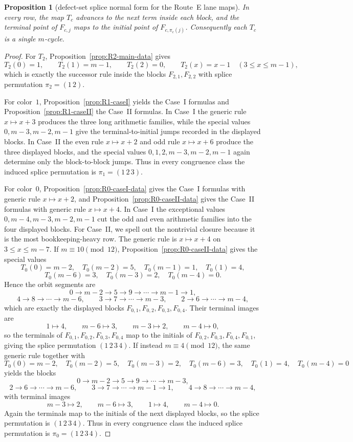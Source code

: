 \documentclass[11pt]{article}
\newtheorem{proposition}{Proposition}
\begin{document}
\begin{proposition}[defect-set splice normal form for the Route~E lane maps]
In every row, the map $T_c$ advances to the next term inside each block, and the terminal point of $F_{c,j}$ maps to the initial point of $F_{c,\pi_c(j)}$.
Consequently each $T_c$ is a single $m$-cycle.
\end{proposition}

\begin{proof}
For $T_2$, Proposition~\ref{prop:R2-main-data} gives
\[
T_2(0)=1,\qquad T_2(1)=m-1,\qquad T_2(2)=0,\qquad T_2(x)=x-1\quad (3\le x\le m-1),
\]
which is exactly the successor rule inside the blocks $F_{2,1},F_{2,2}$ with splice permutation $\pi_2=(1\,2)$.

For color~$1$, Proposition~\ref{prop:R1-caseI} yields the Case~I formulas and Proposition~\ref{prop:R1-caseII} the Case~II formulas.
In Case~I the generic rule $x\mapsto x+3$ produces the three long arithmetic families, while the special values $0,m-3,m-2,m-1$ give the terminal-to-initial jumps recorded in the displayed blocks.
In Case~II the even rule $x\mapsto x+2$ and odd rule $x\mapsto x+6$ produce the three displayed blocks, and the special values $0,1,2,m-3,m-2,m-1$ again determine only the block-to-block jumps.
Thus in every congruence class the induced splice permutation is $\pi_1=(1\,2\,3)$.

For color~$0$, Proposition~\ref{prop:R0-caseI-data} gives the Case~I formulas with generic rule $x\mapsto x+2$, and Proposition~\ref{prop:R0-caseII-data} gives the Case~II formulas with generic rule $x\mapsto x+4$.
In Case~I the exceptional values $0,m-4,m-3,m-2,m-1$ cut the odd and even arithmetic families into the four displayed blocks.
For Case~II, we spell out the nontrivial closure because it is the most bookkeeping-heavy row.
The generic rule is $x\mapsto x+4$ on $3\le x\le m-7$.
If $m\equiv 10\pmod{12}$, Proposition~\ref{prop:R0-caseII-data} gives the special values
\[
T_0(0)=m-2,\quad T_0(m-2)=5,\quad T_0(m-1)=1,\quad T_0(1)=4,
\]
\[
T_0(m-6)=3,\quad T_0(m-3)=2,\quad T_0(m-4)=0.
\]
Hence the orbit segments are
\[
0\to m-2\to 5\to 9\to\cdots\to m-1\to 1,
\]
\[
4\to 8\to\cdots\to m-6,\qquad 3\to 7\to\cdots\to m-3,\qquad 2\to 6\to\cdots\to m-4,
\]
which are exactly the displayed blocks $F_{0,1},F_{0,2},F_{0,3},F_{0,4}$.
Their terminal images are
\[
1\mapsto 4,\qquad m-6\mapsto 3,\qquad m-3\mapsto 2,\qquad m-4\mapsto 0,
\]
so the terminals of $F_{0,1},F_{0,2},F_{0,3},F_{0,4}$ map to the initials of $F_{0,2},F_{0,3},F_{0,4},F_{0,1}$, giving the splice permutation $(1\,2\,3\,4)$.
If instead $m\equiv 4\pmod{12}$, the same generic rule together with
\[
T_0(0)=m-2,\quad T_0(m-2)=5,\quad T_0(m-3)=2,\quad T_0(m-6)=3,\quad T_0(1)=4,\quad T_0(m-4)=0
\]
yields the blocks
\[
0\to m-2\to 5\to 9\to\cdots\to m-3,
\]
\[
2\to 6\to\cdots\to m-6,\qquad 3\to 7\to\cdots\to m-1\to 1,\qquad 4\to 8\to\cdots\to m-4,
\]
with terminal images
\[
m-3\mapsto 2,\qquad m-6\mapsto 3,\qquad 1\mapsto 4,\qquad m-4\mapsto 0.
\]
Again the terminals map to the initials of the next displayed blocks, so the splice permutation is $(1\,2\,3\,4)$.
Thus in every congruence class the induced splice permutation is $\pi_0=(1\,2\,3\,4)$.


\end{proof}
\end{document}
